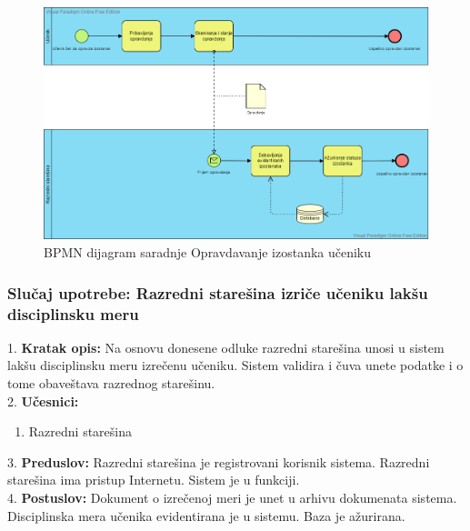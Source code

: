 \documentclass{article}
\begin{document}
\begin{figure} [!ht]
    \begin{center}
        \includegraphics[scale=0.35]{imgs/BPMN_opravdavanje_casova.png}
    \end{center}
\caption{BPMN dijagram saradnje Opravdavanje izostanka učeniku}
\end{figure}

\subsubsection{Slučaj upotrebe: Razredni starešina izriče učeniku lakšu disciplinsku meru}
1. \textbf{Kratak opis:} Na osnovu donesene odluke razredni starešina unosi u sistem lakšu disciplinsku meru izrečenu učeniku. Sistem validira i čuva unete podatke i o tome obaveštava razrednog starešinu. \\

2. \textbf{Učesnici:}
\begin{enumerate} [label=(\alph*)]
\item Razredni starešina
\end{enumerate} 

3. \textbf{Preduslov:} Razredni starešina je registrovani korisnik sistema. Razredni starešina ima pristup Internetu. Sistem je u funkciji. \\

4. \textbf{Postuslov:} Dokument o izrečenoj meri je unet u arhivu dokumenata sistema. Disciplinska mera učenika evidentirana je u sistemu. Baza je ažurirana. \\
\end{document}
